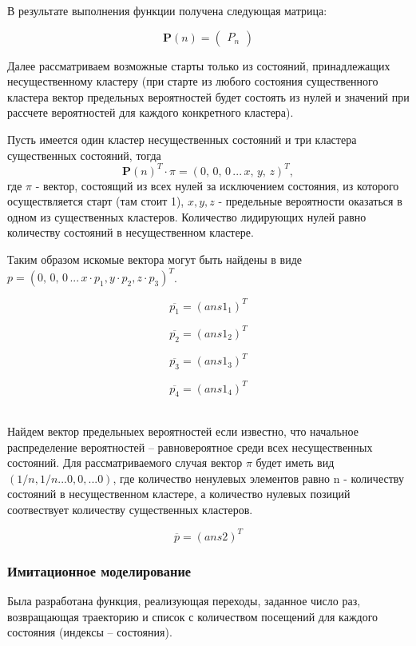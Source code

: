 В результате выполнения функции получена следующая матрица:

$$
\mathbf{P}(n)=
\begin{pmatrix}
 {{ P_n }}
\end{pmatrix}
$$

Далее рассматриваем возможные старты только из состояний, принадлежащих несущественному кластеру
(при старте из любого состояния существенного кластера вектор предельных вероятностей будет состоять из нулей и значений
при рассчете вероятностей для каждого конкретного кластера).

Пусть имеется один кластер несущественных состояний и три кластера существенных состояний, тогда
$$
    \mathbf{P} (n)^T \cdot \pi = (0, \, 0, \, 0 \,...\,x,\, y,\, z)^T,
$$
где $\pi$ - вектор, состоящий из всех нулей за исключением состояния, из которого осуществляется старт (там стоит 1),
$x, y, z$ - предельные вероятности оказаться в одном из существенных кластеров.
Количество лидирующих нулей равно количеству состояний в несущественном кластере.

Таким образом искомые вектора могут быть найдены в виде 
$p = (0,\, 0,\, 0\,...\,x \cdot p_1, y\cdot p_2, z\cdot p_3)^T$.

    \[\overline{p_1} = ({{ ans1_1 }})^T\]

    \[\overline{p_2} = ({{ ans1_2 }})^T\]

    \[\overline{p_3} = ({{ ans1_3 }})^T\]

    \[\overline{p_4} = ({{ ans1_4 }})^T\]

~\\

Найдем вектор предельныех вероятностей если известно, что начальное распределение вероятностей – равновероятное среди
всех несущественных состояний.
Для рассматриваемого случая вектор $\pi$ будет иметь вид $(1/n, 1/n...0, 0,...0)$,
где количество ненулевых элементов равно n - количеству состояний в несущественном кластере, а количество нулевых
позиций соотвествует количеству существенных кластеров.

\[ \overline{p} = ({{ ans2 }})^T\]


\subsubsection{Имитационное моделирование}

Была разработана функция, реализующая переходы, заданное число раз, возвращающая траекторию и список с количеством посещений для каждого состояния (индексы -- состояния).

